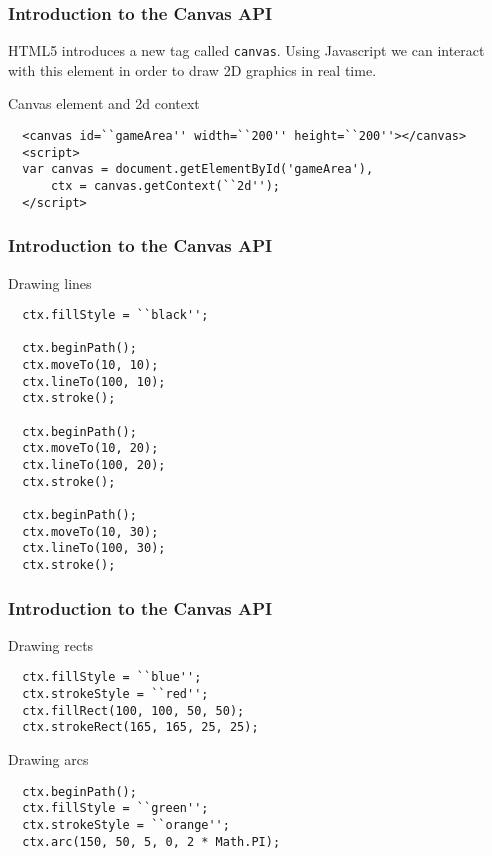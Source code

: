 \begin{frame}[fragile]
  \frametitle{Introduction to the Canvas API}

  HTML5 introduces a new tag called \texttt{canvas}. Using Javascript we can interact with this element in order to draw 2D graphics in real time.

  \begin{block}{Canvas element and 2d context}
  {\scriptsize
  \begin{verbatim}
  <canvas id=``gameArea'' width=``200'' height=``200''></canvas>
  <script>
  var canvas = document.getElementById('gameArea'),
      ctx = canvas.getContext(``2d'');
  </script>
  \end{verbatim}
  }
  \end{block}
\end{frame}

\begin{frame}[fragile]
  \frametitle{Introduction to the Canvas API}

  \begin{block}{Drawing lines}
  {\scriptsize
  \begin{verbatim}
  ctx.fillStyle = ``black'';

  ctx.beginPath();
  ctx.moveTo(10, 10);
  ctx.lineTo(100, 10);
  ctx.stroke();

  ctx.beginPath();
  ctx.moveTo(10, 20);
  ctx.lineTo(100, 20);
  ctx.stroke();

  ctx.beginPath();
  ctx.moveTo(10, 30);
  ctx.lineTo(100, 30);
  ctx.stroke();
  \end{verbatim}
  }
  \end{block}
\end{frame}

\begin{frame}[fragile]
  \frametitle{Introduction to the Canvas API}

  \begin{block}{Drawing rects}
  {\scriptsize
  \begin{verbatim}
  ctx.fillStyle = ``blue'';
  ctx.strokeStyle = ``red'';
  ctx.fillRect(100, 100, 50, 50);
  ctx.strokeRect(165, 165, 25, 25);
  \end{verbatim}
  }
  \end{block}

  \pause

  \begin{block}{Drawing arcs}
  {\scriptsize
  \begin{verbatim}
  ctx.beginPath();
  ctx.fillStyle = ``green'';
  ctx.strokeStyle = ``orange'';
  ctx.arc(150, 50, 5, 0, 2 * Math.PI);
  \end{verbatim}
  }
  \end{block}
\end{frame}

